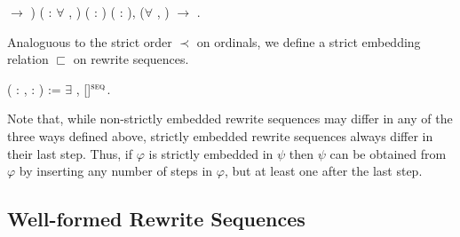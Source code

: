 \begin{singlespace}
\begin{coqdoccode}
\ensuremath{\rightarrow} )
( : \ensuremath{\forall} ,
 )\coqdoceol
\coqdocindent{5.00em}
( :
 
) (\coqdocvar{$\psi$} : 
),\coqdoceol
\coqdocindent{9.50em}
(\ensuremath{\forall} ,  
 \coqdocvariable{$\psi$})
\ensuremath{\rightarrow}\coqdoceol
\coqdocindent{9.50em}
 
 
\coqdocvariable{$\psi$}.\coqdoceol
\end{coqdoccode}
\end{singlespace}

Analoguous to the strict order $\prec$ on ordinals, we define a strict
embedding relation $\sqsubset$ on rewrite sequences.
\begin{singlespace}
\begin{coqdoccode}
\coqdocnoindent
{}
   
(\coqdocvar{$\varphi$} : 
,
\coqdocvar{$\psi$} :
) := \ensuremath{\exists} \coqdocvar{$\iota$},
\coqdocvariable{$\varphi$} 
\coqdocvariable{$\psi$}[\coqdocvariable{$\iota$}]$^\textsc{seq}$.\coqdoceol
\end{coqdoccode}
\end{singlespace}
Note that, while non-strictly embedded rewrite sequences may differ in
any of the three ways defined above, strictly embedded rewrite
sequences always differ in their last step. Thus, if $\varphi$ is
strictly embedded in $\psi$ then $\psi$ can be obtained from $\varphi$
by inserting any number of steps in $\varphi$, but at least one after
the last step.


\subsection{Well-formed Rewrite Sequences}\label{sub:wf}

